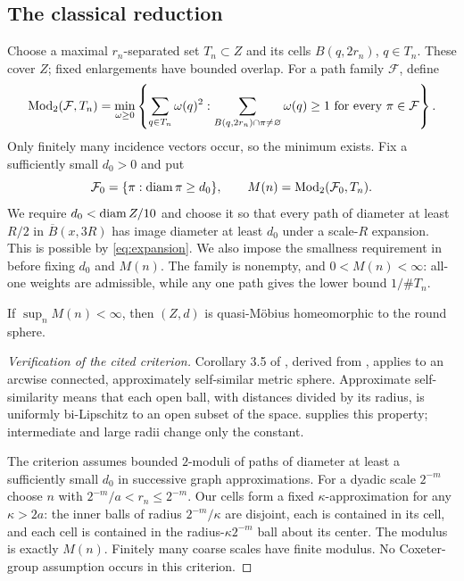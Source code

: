 \subsection{The classical reduction}

Choose a maximal $r_n$-separated set $T_n\subset Z$ and its cells
$B(q,2r_n)$, $q\in T_n$. These cover $Z$; fixed enlargements have
bounded overlap. For a path family $\mathcal F$, define
\[
 \operatorname{Mod}_2(\mathcal F,T_n)=\min_{\omega\ge0}
 \left\{\sum_{q\in T_n}\omega(q)^2:
 \sum_{B(q,2r_n)\cap\pi\ne\varnothing}\omega(q)\ge1
 \text{ for every }\pi\in\mathcal F\right\}.
\]
Only finitely many incidence vectors occur, so the minimum exists.
Fix a sufficiently small $d_0>0$ and put
\begin{equation}
 \mathcal F_0=\{\pi:\operatorname{diam}\pi\ge d_0\},\qquad
 M(n)=\operatorname{Mod}_2(\mathcal F_0,T_n).
 \label{eq:macro-modulus}
\end{equation}
We require $d_0<\operatorname{diam} Z/10$ and choose it so that every path of
diameter at least $R/2$ in $\overline B(x,3R)$ has image diameter
at least $d_0$ under a scale-$R$ expansion. This is possible by
\eqref{eq:expansion}. We also impose the smallness requirement in
 before fixing $d_0$ and $M(n)$.
The family is nonempty, and $0<M(n)<\infty$: all-one weights are
admissible, while any one path gives the lower bound $1/\#T_n$.

\begin{theorem}
\label{thm:uniformization}
If $\sup_n M(n)<\infty$, then $(Z,d)$ is quasi-M\"obius
homeomorphic to the round sphere.
\end{theorem}
\begin{proof}[Verification of the cited criterion]
Corollary 3.5 of \cite{BourdonKleiner}, derived from
\cite[Theorem 10.4]{BK}, applies to an arcwise connected,
approximately self-similar metric sphere. Approximate self-similarity
means that each open ball, with distances divided by its radius,
is uniformly bi-Lipschitz to an open subset of the space.
 supplies this property; intermediate and large
radii change only the constant.

The criterion assumes bounded $2$-moduli of paths of diameter at
least a sufficiently small $d_0$ in successive graph approximations.
For a dyadic scale $2^{-m}$ choose $n$ with
$2^{-m}/a<r_n\le2^{-m}$. Our cells form a fixed $\kappa$-approximation
for any $\kappa>2a$: the inner balls of radius $2^{-m}/\kappa$
are disjoint, each is contained in its cell, and each cell is
contained in the radius-$\kappa2^{-m}$ ball about its center.
The modulus is exactly $M(n)$. Finitely many coarse scales have
finite modulus. No Coxeter-group assumption occurs in this criterion.
\end{proof}

